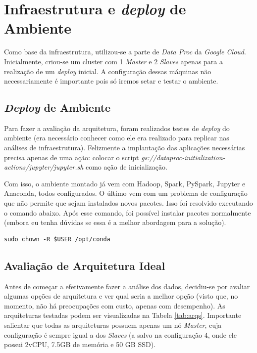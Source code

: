 \documentclass{article}
\begin{document}
\newpage
\section{Infraestrutura e \emph{deploy} de Ambiente}
\label{sect:infra}

Como base da infraestrutura, utilizou-se a parte de \emph{Data Proc} da \emph{Google Cloud}. Inicialmente, criou-se um cluster com 1 \emph{Master} e 2 \emph{Slaves} apenas para a realização de um \emph{deploy} inicial. A configuração dessas máquinas não necessariamente é importante pois só iremos setar e testar o ambiente.

\subsection{\emph{Deploy} de Ambiente}

Para fazer a avaliação da arquitetura, foram realizados testes de \emph{deploy} do ambiente (era necessário conhecer como ele era realizado para replicar nas análises de infraestrutura). Felizmente a implantação das aplicações necessárias precisa apenas de uma ação: colocar o script \emph{gs://dataproc-initialization-actions/jupyter/jupyter.sh} como ação de inicialização.

Com isso, o ambiente montado já vem com Hadoop, Spark, PySpark, Jupyter e Anaconda, todos configurados. O último vem com um problema de configuração que não permite que sejam instalados novos pacotes. Isso foi resolvido executando o comando abaixo. Após esse comando, foi possível instalar pacotes normalmente (embora eu tenha dúvidas se essa é a melhor abordagem para a solução).

\begin{lstlisting}[caption= {Solução de problema de Permissão.},captionpos=b]
sudo chown -R $USER /opt/conda
\end{lstlisting}

\subsection{Avaliação de Arquitetura Ideal}

Antes de começar a efetivamente fazer a análise dos dados, decidiu-se por avaliar algumas opções de arquitetura e ver qual seria a melhor opção (visto que, no momento, não há preocupações com custo, apenas com desempenho). As arquiteturas testadas podem ser visualizadas na Tabela \ref{tab:arqs}. Importante salientar que todas as arquiteturas possuem apenas um nó \emph{Master}, cuja configuração é sempre igual a dos \emph{Slaves} (a salvo na configuração 4, onde ele possui 2vCPU, 7.5GB de memória e 50 GB SSD).
\end{document}
